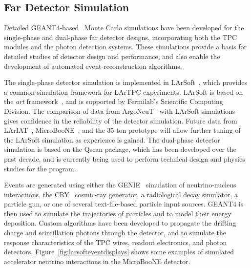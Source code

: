 \subsection{Far Detector Simulation}
\label{sec:detectors-sc-physics-software-simulation-fd}

Detailed GEANT4-based~\cite{GEANT4:NIM,GEANT4} Monte Carlo simulations have been 
developed for the single-phase and dual-phase far detector designs,
incorporating both the TPC modules
and the photon detection systems. These simulations provide
a basis for detailed studies of detector design and performance, 
and also enable the development of automated event-reconstruction algorithms.

The single-phase detector simulation is implemented in LArSoft~\cite{Church:2013hea},
which provides a common simulation framework for LArTPC experiments.
LArSoft is based on the {\it art} framework~\cite{Green:2012gv}, and is supported by Fermilab's
Scientific Computing Division.
The comparison of data from ArgoNeuT~\cite{Anderson:2012vc,Anderson:2012mra} with LArSoft
simulations gives confidence in the reliability of the detector simulation.
Future data from LArIAT~\cite{Adamson:2013/02/28tla,Cavanna:2014iqa},
MicroBooNE~\cite{Chen:2007ae,Jones:2011ci,microboonecdr}, and the 35-ton prototype will allow
further tuning of the LArSoft simulation as experience is gained.
The dual-phase detector simulation is based on the Qscan package,
which has been developed over the past decade, and is currently
being used to perform technical design and physics studies for
the \cerndualproto{} program.

Events are generated using either the GENIE~\cite{GENIE} simulation of 
neutrino-nucleus interactions, the CRY~\cite{Cosmic-CRY,Cosmic-CRY-protons,CRY-url} cosmic-ray generator, 
a radiological decay simulator, a particle gun, or one of several
text-file-based particle input sources. GEANT4 is then used to simulate the trajectories
of particles and to model their energy deposition.  
Custom algorithms have been developed to propagate the drifting charge
and scintillation photons through the detector, and to simulate the
response characteristics of the TPC wires, readout electronics, and photon detectors.
Figure~\ref{fig:larsofteventdisplays} shows some examples of simulated 
accelerator neutrino interactions in the MicroBooNE detector.

